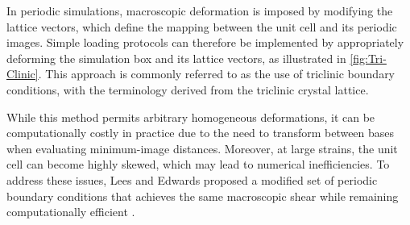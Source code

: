 \documentclass[asymmetricmargins]{library/duthesis}%
\begin{document}
In periodic simulations, macroscopic deformation is imposed by modifying the lattice vectors, which define the mapping between the unit cell and its periodic images. Simple loading protocols can therefore be implemented by appropriately deforming the simulation box and its lattice vectors, as illustrated in \cref{fig:Tri-Clinic}. This approach is commonly referred to as the use of triclinic boundary conditions, with the terminology derived from the triclinic crystal lattice.

While this method permits arbitrary homogeneous deformations, it can be computationally costly in practice due to the need to transform between bases when evaluating minimum-image distances. Moreover, at large strains, the unit cell can become highly skewed, which may lead to numerical inefficiencies. To address these issues, Lees and Edwards proposed a modified set of periodic boundary conditions that achieves the same macroscopic shear while remaining computationally efficient \cite{lees_computer_1972}.
\end{document}
